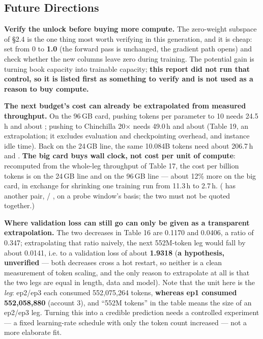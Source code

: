\subsection{Future Directions}

\textbf{Verify the unlock before buying more compute.} The zero-weight subspace of \S2.4 is the one
thing most worth verifying in this generation, and it is cheap: set  from 0 to
\textbf{1.0} (the forward pass is unchanged, the gradient path opens) and check whether the new
columns leave zero during training. The potential gain is turning book capacity into trainable
capacity; \textbf{this report did not run that control, so it is listed first as something to
verify and is not used as a reason to buy compute.}

\textbf{The next budget's cost can already be extrapolated from measured throughput.} On the
96\,GB card, pushing tokens per parameter to 10 needs 24.5\,h and about ; pushing to
Chinchilla 20$\times$ needs 49.0\,h and about  (Table 19, an extrapolation; it
excludes evaluation and checkpointing overhead, and instance idle time). Back on the 24\,GB line,
the same 10.084B tokens need about 206.7\,h and . \textbf{The big card buys wall clock,
not cost per unit of compute}: recomputed from the whole-leg throughput of Table 17, the cost per
billion tokens is \textbf{} on the 24\,GB line and \textbf{} on the
96\,GB line --- about 12\% more on the big card, in exchange for shrinking one training run from
11.3\,h to 2.7\,h. ( has another pair,  / , on a probe
window's basis; the two must not be quoted together.)

\textbf{Where validation loss can still go can only be given as a transparent extrapolation.} The
two decreases in Table 16 are 0.1170 and 0.0406, a ratio of 0.347; extrapolating that ratio
naively, the next 552M-token leg would fall by about 0.0141, i.e. to a validation loss of about
\textbf{1.9318} (\textbf{a hypothesis, unverified} --- both decreases cross a hot restart, so
neither is a clean measurement of token scaling, and the only reason to extrapolate at all is that
the two legs are equal in length, data and model). Note that the unit here is the \emph{leg}:
ep2/ep3 each consumed 552{,}075{,}264 tokens, \textbf{whereas ep1 consumed 552{,}058{,}880}
(account 3), and ``552M tokens'' in the table means the size of an ep2/ep3 leg. Turning this into
a credible prediction needs a controlled experiment --- a fixed learning-rate schedule with only
the token count increased --- not a more elaborate fit.

